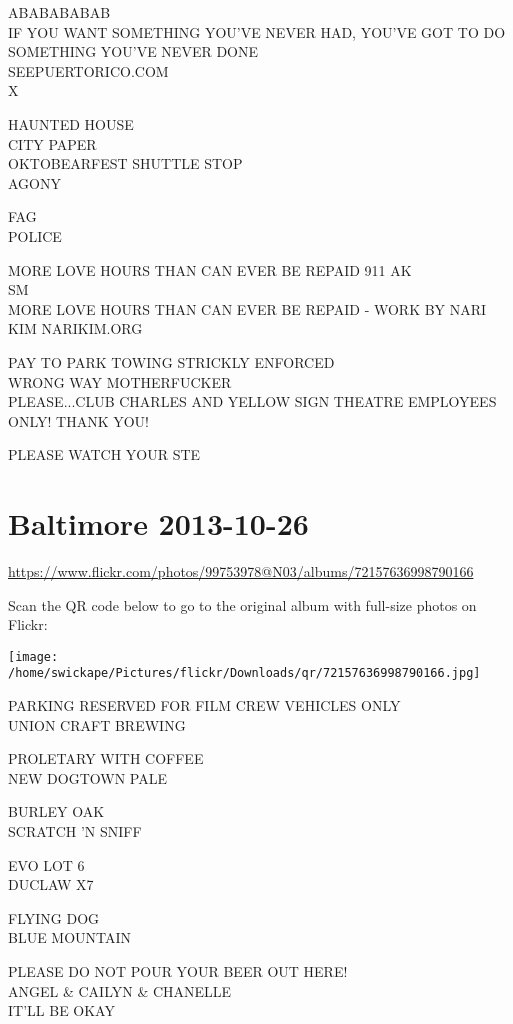 \documentclass[10pt,letterpaper]{article}
\begin{document}
ABABABABAB\\
IF YOU WANT SOMETHING YOU'VE NEVER HAD, YOU'VE GOT TO DO SOMETHING YOU'VE NEVER DONE\\
SEEPUERTORICO.COM\\
X

HAUNTED HOUSE\\
CITY PAPER\\
OKTOBEARFEST SHUTTLE STOP\\
AGONY

FAG\\
POLICE

MORE LOVE HOURS THAN CAN EVER BE REPAID 911 AK\\
SM\\
MORE LOVE HOURS THAN CAN EVER BE REPAID {-} WORK BY NARI KIM NARIKIM.ORG

PAY TO PARK TOWING STRICKLY ENFORCED\\
WRONG WAY MOTHERFUCKER\\
PLEASE...CLUB CHARLES AND YELLOW SIGN THEATRE EMPLOYEES ONLY!  THANK YOU!

PLEASE WATCH YOUR STE
\pagebreak

\section*{Baltimore 2013-10-26}

\url{https://www.flickr.com/photos/99753978@N03/albums/72157636998790166}

Scan the QR code below to go to the original album with full-size photos on Flickr:

\texttt{[image: /home/swickape/Pictures/flickr/Downloads/qr/72157636998790166.jpg]}
\pagebreak

PARKING RESERVED FOR FILM CREW VEHICLES ONLY\\
UNION CRAFT BREWING

PROLETARY WITH COFFEE\\
NEW DOGTOWN PALE

BURLEY OAK\\
SCRATCH 'N SNIFF

EVO LOT 6\\
DUCLAW X7

FLYING DOG\\
BLUE MOUNTAIN

PLEASE DO NOT POUR YOUR BEER OUT HERE!\\
ANGEL \& CAILYN \& CHANELLE\\
IT'LL BE OKAY
\end{document}

